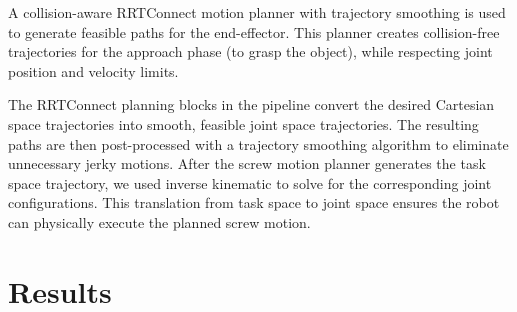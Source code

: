 \documentclass{article}
\begin{document}
A collision-aware RRTConnect motion planner with trajectory smoothing is used to generate feasible paths for the end-effector. This planner creates collision-free trajectories for the approach phase (to grasp the object), while respecting joint position and velocity limits.

\begin{center}
\end{center}

The RRTConnect planning blocks in the pipeline convert the desired Cartesian space trajectories into smooth, feasible joint space trajectories. The resulting paths are then post-processed with a trajectory smoothing algorithm to eliminate unnecessary jerky motions. After the screw motion planner generates the task space trajectory, we used inverse kinematic to solve for the corresponding joint configurations. This translation from task space to joint space ensures the robot can physically execute the planned screw motion. 

\section{Results}
\end{document}
